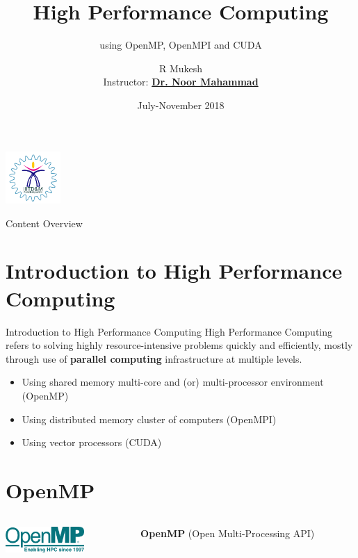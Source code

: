 \documentclass{beamer}
\title{High Performance Computing}
\subtitle{\small{using OpenMP, OpenMPI and CUDA}}
\author[R Mukesh]{R Mukesh\\{\scriptsize  Instructor: \href{https://scholar.google.co.in/citations?user=sbzsjNcAAAAJ&hl=en&oi=sra}{\textbf{Dr. Noor Mahammad}}}}
\institute{IIITDM Kancheepuram}
\date{July-November 2018}
\begin{document}
	
	{
		\begin{frame}
			\titlepage
			\centering
			\includegraphics[height=2cm]{iiitdmlogo}
		\end{frame}
	}
	
	\begin{frame}{Content Overview}
		\tableofcontents
	\end{frame}
	
	\section{Introduction to High Performance Computing}
		\begin{frame}{Introduction to High Performance Computing}
			High Performance Computing refers to solving highly resource-intensive problems quickly and efficiently, mostly through use of \textbf{parallel computing} infrastructure at multiple levels.
			\linebreak
			\begin{itemize}
				\item Using shared memory multi-core and (or) multi-processor environment (OpenMP)
				\item Using distributed memory cluster of computers (OpenMPI)
				\item Using vector processors (CUDA)
			\end{itemize}
			
		\end{frame}
	
	\section{OpenMP}
		\begin{frame}
			\begin{columns}
				\begin{column}{0.3\textwidth}
					\includegraphics[width=3cm]{openmplogo}		
				\end{column}
			
				\begin{column}{0.7\textwidth}
					\begin{block}{}
						\vspace{8pt}
						\centering
						\textbf{\Huge{OpenMP}}
						\linebreak
						{\small (Open Multi-Processing API)}
						\vspace{6pt}
					\end{block}
				\end{column}
			\end{columns}
			
		\end{frame}
		
\end{document}
